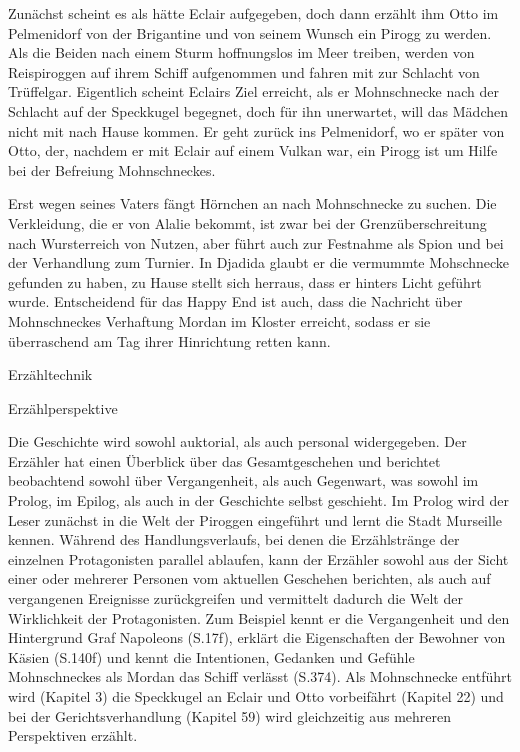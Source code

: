 Zunächst scheint es als hätte Eclair aufgegeben, doch dann erzählt ihm Otto im Pelmenidorf von der Brigantine und von seinem Wunsch ein Pirogg zu werden. Als die Beiden nach einem Sturm hoffnungslos im Meer treiben, werden von Reispiroggen auf ihrem Schiff aufgenommen und fahren mit zur Schlacht von Trüffelgar. Eigentlich scheint Eclairs Ziel erreicht, als er Mohnschnecke nach der Schlacht auf der Speckkugel begegnet, doch für ihn unerwartet, will das Mädchen nicht mit nach Hause kommen. Er geht zurück ins Pelmenidorf, wo er später von Otto, der, nachdem er mit Eclair auf einem Vulkan war, ein Pirogg ist um Hilfe bei der Befreiung Mohnschneckes.

Erst wegen seines Vaters fängt Hörnchen an nach Mohnschnecke zu suchen. Die Verkleidung, die er von Alalie bekommt, ist zwar bei der Grenzüberschreitung nach Wursterreich von Nutzen, aber führt auch zur Festnahme als Spion und bei der Verhandlung zum Turnier. In Djadida glaubt er die vermummte Mohschnecke gefunden zu haben, zu Hause stellt sich herraus, dass er hinters Licht geführt wurde. 
Entscheidend für das Happy End ist auch, dass die Nachricht über Mohnschneckes Verhaftung Mordan im Kloster erreicht, sodass er sie überraschend am Tag ihrer Hinrichtung retten kann.


Erzähltechnik
	
Erzählperspektive

Die Geschichte wird sowohl auktorial, als auch personal widergegeben. Der Erzähler hat einen Überblick über das Gesamtgeschehen und berichtet  beobachtend sowohl über Vergangenheit, als auch Gegenwart, was sowohl im Prolog, im Epilog, als auch in der Geschichte selbst geschieht. 
Im Prolog wird der Leser zunächst in die Welt der Piroggen eingeführt und lernt die Stadt Murseille kennen. Während des Handlungsverlaufs, bei denen die Erzählstränge der einzelnen Protagonisten parallel ablaufen, kann der Erzähler sowohl aus der Sicht einer oder mehrerer Personen vom aktuellen Geschehen berichten, als auch auf vergangenen Ereignisse zurückgreifen und vermittelt dadurch die Welt der Wirklichkeit der Protagonisten. Zum Beispiel kennt er die Vergangenheit und den Hintergrund Graf Napoleons (S.17f), erklärt die Eigenschaften der Bewohner von Käsien (S.140f) und kennt die Intentionen, Gedanken und Gefühle Mohnschneckes als Mordan das Schiff verlässt (S.374). Als Mohnschnecke entführt wird (Kapitel 3) die Speckkugel an Eclair und Otto vorbeifährt (Kapitel 22) und bei der Gerichtsverhandlung (Kapitel 59) wird gleichzeitig aus mehreren Perspektiven erzählt.



